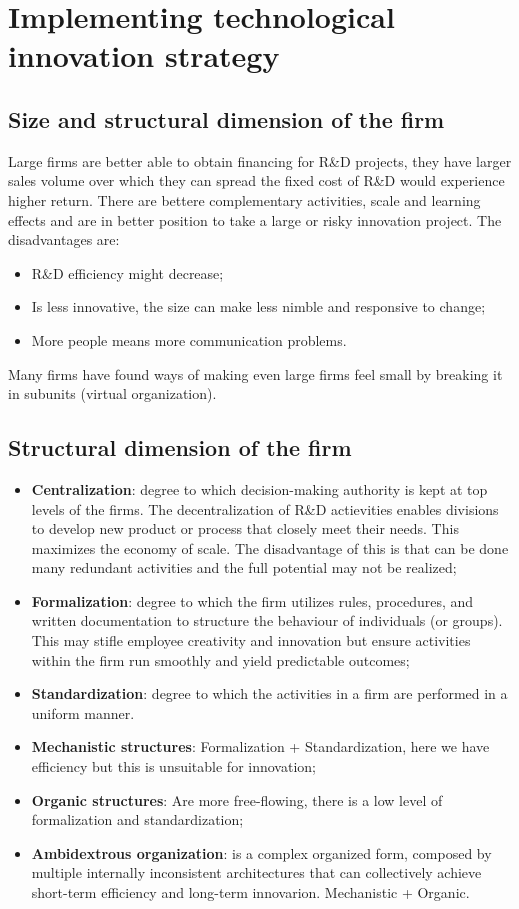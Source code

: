 \documentclass[12pt]{article}
\begin{document}
\section{Implementing technological innovation strategy}
\subsection{Size and structural dimension of the firm}
Large firms are better able to obtain financing for R\&D projects, they have larger sales volume over which they can spread the fixed cost of R\&D would experience higher return.
There are bettere complementary activities, scale and learning effects and are in better position to take a large or risky innovation project.
The disadvantages are:
\begin{itemize}
    \item R\&D efficiency might decrease;
    \item Is less innovative, the size can make less nimble and responsive to change;
    \item More people means more communication problems.
\end{itemize}

Many firms have found ways of making even large firms feel small by breaking it in subunits (virtual organization).

\subsection{Structural dimension of the firm}
\begin{itemize}
    \item \textbf{Centralization}: degree to which decision-making authority is kept at top levels of the firms.
    The decentralization of R\&D actievities enables divisions to develop new product or process that closely meet their needs.
    This maximizes the economy of scale. The disadvantage of this is that can be done many redundant activities and the full potential may not be realized;
    \item \textbf{Formalization}: degree to which the firm utilizes rules, procedures, and written documentation to structure the behaviour of individuals (or groups). 
    This may stifle employee creativity and innovation but ensure activities within the firm run smoothly and yield predictable outcomes;
    \item \textbf{Standardization}: degree to which the activities in a firm are performed in a uniform manner. 
    \item \textbf{Mechanistic structures}: Formalization + Standardization, here we have efficiency but this is unsuitable for innovation;
    \item \textbf{Organic structures}: Are more free-flowing, there is a low level of formalization and standardization;
    \item \textbf{Ambidextrous organization}: is a complex organized form, composed by multiple internally inconsistent architectures that can collectively achieve short-term efficiency and long-term innovarion. Mechanistic + Organic.
\end{itemize}
\end{document}
